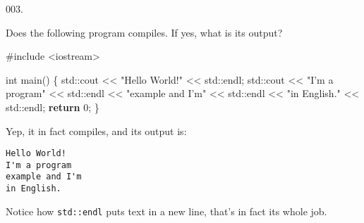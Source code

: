 \documentclass[]{article}
\newenvironment{Shaded}{}{}
\newcommand{\BuiltInTok}[1]{#1}
\newcommand{\ControlFlowTok}[1]{\textcolor[rgb]{0.00,0.44,0.13}{\textbf{#1}}}
\newcommand{\DataTypeTok}[1]{\textcolor[rgb]{0.56,0.13,0.00}{#1}}
\newcommand{\DecValTok}[1]{\textcolor[rgb]{0.25,0.63,0.44}{#1}}
\newcommand{\ImportTok}[1]{#1}
\newcommand{\NormalTok}[1]{#1}
\newcommand{\PreprocessorTok}[1]{\textcolor[rgb]{0.74,0.48,0.00}{#1}}
\newcommand{\StringTok}[1]{\textcolor[rgb]{0.25,0.44,0.63}{#1}}
\begin{document}
\vspace{2mm}\noindent\hrulefill{}

\noindent
{\tiny 003.}\\
\begin{minipage}[t]{.485\linewidth}

Does the following program compiles. If yes, what is its output?

\begin{framed}

\begin{Shaded}
\begin{Highlighting}[]
\PreprocessorTok{#include }\ImportTok{<iostream>}

\DataTypeTok{int}\NormalTok{ main()}
\NormalTok{\{}
  \BuiltInTok{std::}\NormalTok{cout << }\StringTok{"Hello World!"}\NormalTok{ << }\BuiltInTok{std::}\NormalTok{endl;}
  \BuiltInTok{std::}\NormalTok{cout << }\StringTok{"I'm a program"}
\NormalTok{            << }\BuiltInTok{std::}\NormalTok{endl}
\NormalTok{            << }\StringTok{"example and I'm"}
\NormalTok{            << }\BuiltInTok{std::}\NormalTok{endl}
\NormalTok{            << }\StringTok{"in English."}
\NormalTok{            << }\BuiltInTok{std::}\NormalTok{endl;}
  \ControlFlowTok{return} \DecValTok{0}\NormalTok{;}
\NormalTok{\}}
\end{Highlighting}
\end{Shaded}

\end{framed}

\end{minipage}
\hfill
\begin{minipage}[t]{.485\linewidth}

Yep, it in fact compiles, and its output is:

\begin{framed}

\begin{verbatim}
Hello World!
I'm a program
example and I'm
in English.
\end{verbatim}

\end{framed}

Notice how \texttt{std::endl} puts text in a new line, that's in fact
its whole job.

\end{minipage}

\vspace{2mm}\noindent\hrulefill{}
\end{document}

